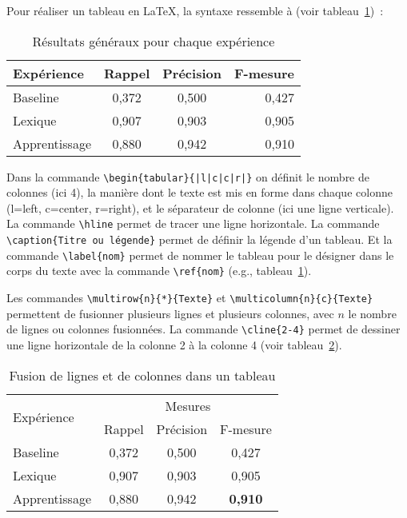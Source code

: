Pour réaliser un  tableau en \LaTeX{}, la syntaxe
ressemble à (voir tableau~\ref{tab:exemple})~:
%
\begin{table}[h]
  \centering
  \begin{tabular}{|l|c|c|r|} \hline
    Expérience & Rappel & Précision & F-mesure \\ \hline
    Baseline & 0,372 & 0,500 & 0,427 \\
    Lexique & 0,907 & 0,903 & 0,905 \\
    Apprentissage & 0,880 & 0,942 & 0,910 \\ \hline
  \end{tabular}
  \caption{Résultats généraux pour chaque expérience}
  \label{tab:exemple}
\end{table}

Dans la commande \verb+\begin{tabular}{|l|c|c|r|}+ on définit le
  nombre de colonnes (ici 4), la manière dont le texte est mis en
  forme dans chaque colonne (l=left, c=center, r=right), et le
  séparateur de colonne (ici une ligne verticale). La commande
  \verb+\hline+ permet de tracer une ligne horizontale. La commande
  \verb+\caption{Titre ou légende}+ permet de définir la légende d'un
  tableau. Et la commande \verb+\label{nom}+ permet de nommer le
  tableau pour le désigner dans le corps du texte avec la commande
  \verb+\ref{nom}+ (e.g., tableau~\ref{tab:exemple}).

Les commandes \verb+\multirow{n}{*}{Texte}+ et
\verb+\multicolumn{n}{c}{Texte}+ permettent de fusionner plusieurs
lignes et plusieurs colonnes, avec $n$ le nombre de lignes ou colonnes
fusionnées. La commande \verb+\cline{2-4}+ permet de dessiner une
ligne horizontale de la colonne 2 à la colonne 4 (voir tableau~\ref{tab:autre}).
%
\begin{table}[h]
  \centering
  \begin{tabular}{|l|ccc|} \hline
    \multirow{2}{*}{Expérience} & \multicolumn{3}{c|}{Mesures} \\ \cline{2-4}
    & Rappel & Précision & F-mesure \\ \hline
    Baseline & 0,372 & 0,500 & 0,427 \\
    Lexique & 0,907 & 0,903 & 0,905 \\
    Apprentissage & 0,880 & 0,942 & \textbf{0,910} \\ \hline
  \end{tabular}
  \caption{Fusion de lignes et de colonnes dans un tableau}
  \label{tab:autre}
\end{table}


